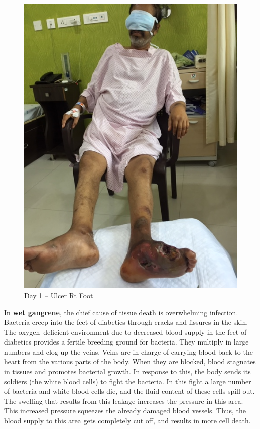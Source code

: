 \begin{figure}
\includegraphics{images/068.jpg}
\caption{Day 1 – Ulcer Rt Foot}
\end{figure}

In \textbf{wet gangrene}, the chief cause of tissue death is overwhelming infection. Bacteria creep into the feet of diabetics through cracks and fissures in the skin. The oxygen–deficient environment due to decreased blood supply in the feet of diabetics provides a fertile breeding ground for bacteria. They multiply in large numbers and clog up the veins. Veins are in charge of carrying blood back to the heart from the various parts of the body. When they are blocked, blood stagnates in tissues and promotes bacterial growth. In response to this, the body sends its soldiers (the white blood cells) to fight the bacteria. In this fight a large number of bacteria and white blood cells die, and the fluid content of these cells spill out. The swelling that results from this leakage increases the pressure in this area. This increased pressure squeezes the already damaged blood vessels. Thus, the blood supply to this area gets completely cut off, and results in more cell death.

